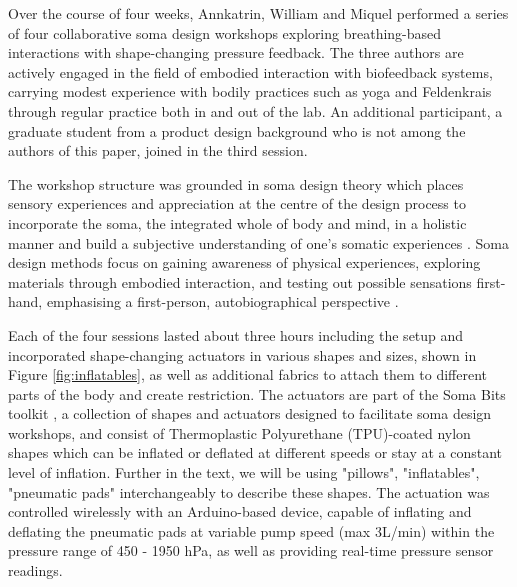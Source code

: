 Over the course of four weeks, Annkatrin, William and Miquel performed a series of four collaborative soma design workshops exploring breathing-based interactions with shape-changing pressure feedback. The three authors are actively engaged in the field of embodied interaction with biofeedback systems, carrying modest experience with bodily practices such as yoga and Feldenkrais through regular practice both in and out of the lab. An additional participant, a graduate student from a product design background who is not among the authors of this paper, joined in the third session. 

The workshop structure was grounded in soma design theory which places sensory experiences and appreciation at the centre of the design process to incorporate the soma, the integrated whole of body and mind, in a holistic manner and build a subjective understanding of one’s somatic experiences \cite{hook_designing_2018}. Soma design methods focus on gaining awareness of physical experiences, exploring materials through embodied interaction, and testing out possible sensations first-hand, emphasising a first-person, autobiographical perspective \cite{hook_embracing_2018, neustaedter_autobiographical_2012}.


Each of the four sessions lasted about three hours including the setup and incorporated shape-changing actuators in various shapes and sizes, shown in Figure \ref{fig:inflatables}, as well as additional fabrics to attach them to different parts of the body and create restriction. The actuators are part of the Soma Bits toolkit \cite{windlin_soma_2019}, a collection of shapes and actuators designed to facilitate soma design workshops, and consist of Thermoplastic Polyurethane (TPU)-coated nylon shapes which can be inflated or deflated at different speeds or stay at a constant level of inflation. Further in the text, we will be using "pillows", "inflatables", "pneumatic pads" interchangeably to describe these shapes. The actuation was controlled wirelessly with an Arduino-based device, capable of inflating and deflating the pneumatic pads at variable pump speed (max 3L/min) within the pressure range of 450 - 1950 hPa, as well as providing real-time pressure sensor readings.

